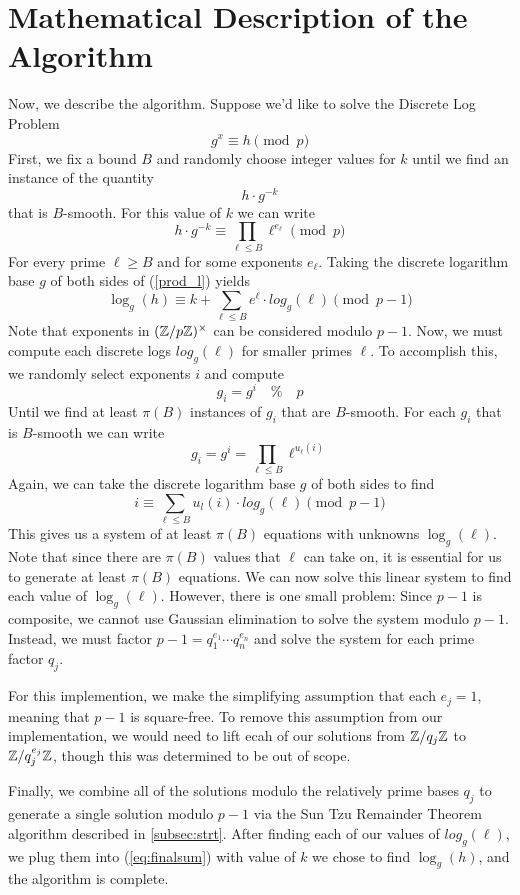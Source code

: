 \documentclass[]{math_paper}
\begin{document}
\section{Mathematical Description of the Algorithm} \label{sec:mathalg}
Now, we describe the algorithm. Suppose we'd like to solve the Discrete Log Problem
\begin{equation}
    g^x \equiv h \pmod p
\end{equation}
First, we fix a bound $B$ and randomly choose integer values for $k$ until we find an instance of the quantity
\[
    h \cdot g^{-k}
\]
that is $B$-smooth. For this value of $k$ we can write
\begin{equation} \label{prod_l}
    h \cdot g^{-k} \equiv \prod_{\ell \leq B}\ell^{e_\ell} \pmod p
\end{equation}
For every prime $\ell \geq B$ and for some exponents $e_\ell$. Taking the discrete logarithm base $g$ of both sides of (\ref{prod_l}) yields
\begin{equation} \label{eq:finalsum}
    \log_g(h) \equiv k + \sum_{\ell \leq B} e^\ell \cdot log_g(\ell) \pmod{p-1}
\end{equation}
Note that exponents in $(\mathbb{Z}/p\mathbb{Z})^\times$ can be considered modulo $p-1$. Now, we must compute each discrete logs $log_g(\ell)$ for smaller primes $\ell$. To accomplish this, we randomly select exponents $i$ and compute
\[
    g_i = g^i \quad \% \quad p
\]
Until we find at least $\pi(B)$ instances of $g_i$ that are $B$-smooth. For each $g_i$ that is $B$-smooth we can write
\[
    g_i = g^i = \prod_{\ell \leq B} \ell^{u_\ell(i)}
\]
Again, we can take the discrete logarithm base $g$ of both sides to find
\begin{equation} \label{eq_i}
    i \equiv  \sum_{\ell \leq B}u_l(i) \cdot log_g(\ell) \pmod{p-1}
\end{equation}
This gives us a system of at least $\pi(B)$ equations with unknowns $\log_g(\ell)$. Note that since there are $\pi(B)$ values that $\ell$ can take on, it is essential for us to generate at least $\pi(B)$ equations. We can now solve this linear system to find each value of $\log_g(\ell)$. However, there is one small problem: Since $p-1$ is composite, we cannot use Gaussian elimination to solve the system modulo $p-1$. Instead, we must factor $p-1 = q_1^{e_1} \cdots q_n^{e_n}$ and solve the system for each prime factor $q_j$.
\begin{remark} \label{rmk:lift}
    For this implemention, we make the simplifying assumption that each $e_j = 1$, meaning that $p-1$ is square-free. To remove this assumption from our implementation, we would need to lift ecah of our solutions from $\mathbb{Z}/q_j\mathbb{Z}$ to $\mathbb{Z}/q_j^{e_j}\mathbb{Z}$, though this was determined to be out of scope. \cite{Hoffstein2008}
\end{remark}
Finally, we combine all of the solutions modulo the relatively prime bases $q_j$ to generate a single solution modulo $p-1$ via the Sun Tzu Remainder Theorem algorithm described in \ref{subsec:strt}. After finding each of our values of $log_g(\ell)$, we plug them into (\ref{eq:finalsum}) with value of $k$ we chose to find $\log_g(h)$, and the algorithm is complete.
\end{document}
